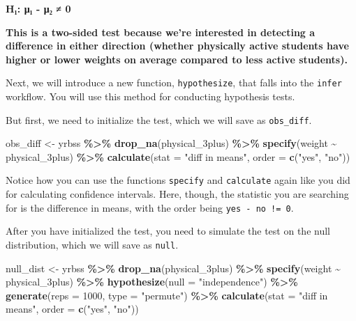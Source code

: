 \documentclass[
]{article}
\newenvironment{Shaded}{\begin{snugshade}}{\end{snugshade}}
\newcommand{\AttributeTok}[1]{\textcolor[rgb]{0.13,0.29,0.53}{#1}}
\newcommand{\DecValTok}[1]{\textcolor[rgb]{0.00,0.00,0.81}{#1}}
\newcommand{\FunctionTok}[1]{\textcolor[rgb]{0.13,0.29,0.53}{\textbf{#1}}}
\newcommand{\NormalTok}[1]{#1}
\newcommand{\OtherTok}[1]{\textcolor[rgb]{0.56,0.35,0.01}{#1}}
\newcommand{\SpecialCharTok}[1]{\textcolor[rgb]{0.81,0.36,0.00}{\textbf{#1}}}
\newcommand{\StringTok}[1]{\textcolor[rgb]{0.31,0.60,0.02}{#1}}
\begin{document}
\textbf{H₁: μ₁ - μ₂ ≠ 0}

\textbf{This is a two-sided test because we're interested in detecting a
difference in either direction (whether physically active students have
higher or lower weights on average compared to less active students).}

Next, we will introduce a new function, \texttt{hypothesize}, that falls
into the \texttt{infer} workflow. You will use this method for
conducting hypothesis tests.

But first, we need to initialize the test, which we will save as
\texttt{obs\_diff}.

\begin{Shaded}
\begin{Highlighting}[]
\NormalTok{obs\_diff }\OtherTok{\textless{}{-}}\NormalTok{ yrbss }\SpecialCharTok{\%\textgreater{}\%}
  \FunctionTok{drop\_na}\NormalTok{(physical\_3plus) }\SpecialCharTok{\%\textgreater{}\%}
  \FunctionTok{specify}\NormalTok{(weight }\SpecialCharTok{\textasciitilde{}}\NormalTok{ physical\_3plus) }\SpecialCharTok{\%\textgreater{}\%}
  \FunctionTok{calculate}\NormalTok{(}\AttributeTok{stat =} \StringTok{"diff in means"}\NormalTok{, }\AttributeTok{order =} \FunctionTok{c}\NormalTok{(}\StringTok{"yes"}\NormalTok{, }\StringTok{"no"}\NormalTok{))}
\end{Highlighting}
\end{Shaded}

Notice how you can use the functions \texttt{specify} and
\texttt{calculate} again like you did for calculating confidence
intervals. Here, though, the statistic you are searching for is the
difference in means, with the order being \texttt{yes\ -\ no\ !=\ 0}.

After you have initialized the test, you need to simulate the test on
the null distribution, which we will save as \texttt{null}.

\begin{Shaded}
\begin{Highlighting}[]
\NormalTok{null\_dist }\OtherTok{\textless{}{-}}\NormalTok{ yrbss }\SpecialCharTok{\%\textgreater{}\%}
  \FunctionTok{drop\_na}\NormalTok{(physical\_3plus) }\SpecialCharTok{\%\textgreater{}\%}
  \FunctionTok{specify}\NormalTok{(weight }\SpecialCharTok{\textasciitilde{}}\NormalTok{ physical\_3plus) }\SpecialCharTok{\%\textgreater{}\%}
  \FunctionTok{hypothesize}\NormalTok{(}\AttributeTok{null =} \StringTok{"independence"}\NormalTok{) }\SpecialCharTok{\%\textgreater{}\%}
  \FunctionTok{generate}\NormalTok{(}\AttributeTok{reps =} \DecValTok{1000}\NormalTok{, }\AttributeTok{type =} \StringTok{"permute"}\NormalTok{) }\SpecialCharTok{\%\textgreater{}\%}
  \FunctionTok{calculate}\NormalTok{(}\AttributeTok{stat =} \StringTok{"diff in means"}\NormalTok{, }\AttributeTok{order =} \FunctionTok{c}\NormalTok{(}\StringTok{"yes"}\NormalTok{, }\StringTok{"no"}\NormalTok{))}
\end{Highlighting}
\end{Shaded}
\end{document}
